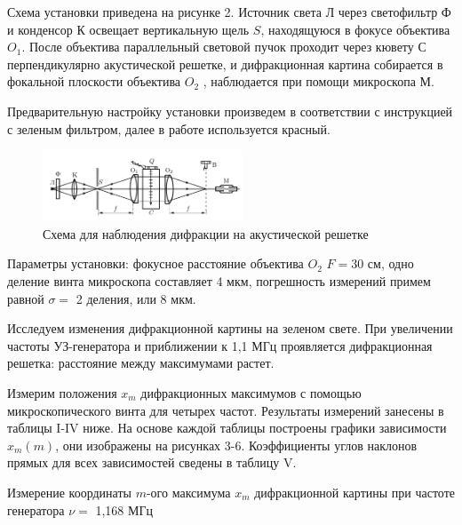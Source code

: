 \documentclass[journal, a4paper]{IEEEtran}
\begin{document}
Схема установки приведена на рисунке 2. Источник света Л через светофильтр Ф и конденсор К освещает вертикальную щель $ S $, находящуюся в фокусе объектива $ O_1 $. После объектива параллельный световой пучок проходит через кювету С перпендикулярно акустической решетке, и дифракционная картина собирается в фокальной плоскости объектива $ O_2 $ , наблюдается при помощи микроскопа М.

Предварительную настройку установки произведем в соответствии с инструкцией с зеленым фильтром, далее в работе используется красный.

	\begin{figure}[h!]
	\centering	
	\includegraphics[width=0.53\textwidth]{shema1.png}
	\caption{Схема для наблюдения дифракции на акустической решетке}
	\label{shema1}
\end{figure}

Параметры установки: фокусное расстояние объектива $  O_2  $ $ F = 30 $ см, одно деление винта микроскопа составляет 4 мкм, погрешность измерений примем равной  $ \sigma = $ 2 деления, или 8 мкм.

Исследуем изменения дифракционной картины на зеленом свете. При увеличении частоты УЗ-генератора и приближении к 1,1 МГц проявляется дифракционная решетка: расстояние между максимумами растет.

Измерим положения $ x_m $ дифракционных максимумов с помощью микроскопического винта для четырех частот. Результаты измерений занесены в таблицы {\footnotesize I-IV} ниже. На основе каждой таблицы построены графики зависимости $ x_m (m) $, они изображены на рисунках 3-6. Коэффициенты углов наклонов прямых для всех зависимостей сведены в таблицу {\small V}. 

	\begin{table}[h!]
	\centering
	
	\caption{Измерение координаты $ m $-ого максимума $ x_m $ дифракционной картины при частоте генератора $ \nu = $ 1,168 МГц}
	\label{nu1}
\end{table}	
\end{document}
